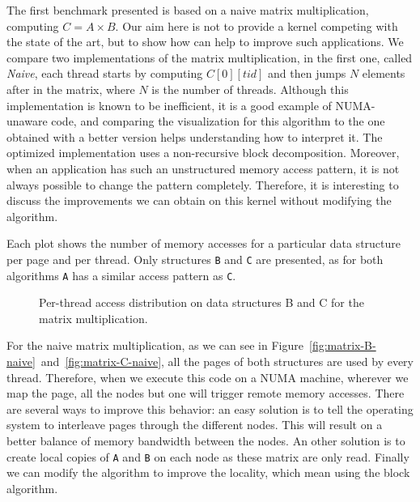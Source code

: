 The first benchmark presented is based on a naive matrix multiplication,
computing $C=A \times B$. Our aim here is not to provide a kernel competing with the
state of the art, but to show how \TABARNAC can help to improve such
applications. We compare two implementations of the matrix multiplication, in
the first one, called \emph{Naive}, each thread starts by computing
$C[0][tid]$ and then jumps $N$ elements after in the matrix, where $N$ is the
number of threads. Although this implementation is known to be inefficient, it is a
good example of NUMA-unaware code, and comparing the \TABARNAC visualization
for this algorithm to the one obtained with a better version helps understanding
how to interpret it.
The optimized implementation uses a non-recursive block
decomposition.
Moreover, when an application has such an unstructured memory access pattern, it
is not always possible to change the pattern completely. Therefore, it is
interesting to discuss the improvements we can obtain on this kernel without
modifying the algorithm.

Each plot shows the number of memory accesses for a particular data structure
per page and per thread. Only structures \texttt{B} and \texttt{C} are
presented, as for both algorithms \texttt{A} has a similar access
pattern as \texttt{C}.

\begin{figure}[htb]
    \centering
    \caption{Per-thread access distribution on data structures B and C for the
    matrix multiplication.}
\end{figure}

For the naive matrix multiplication, as we can see in
Figure~\ref{fig:matrix-B-naive}~and~\ref{fig:matrix-C-naive}, all the pages of both structures are used by every
thread. Therefore, when we execute this code on a NUMA machine, wherever we
map the page, all the nodes but one will trigger remote memory accesses. There
are several ways to improve this behavior: an easy solution
is to tell the operating system to interleave pages through the different
nodes. This will result on a better balance of memory bandwidth between the
nodes. An other solution is to create local copies of \texttt{A} and
\texttt{B} on each node as these matrix are only read. Finally we can modify
the algorithm to improve the locality, which mean using the block algorithm.

